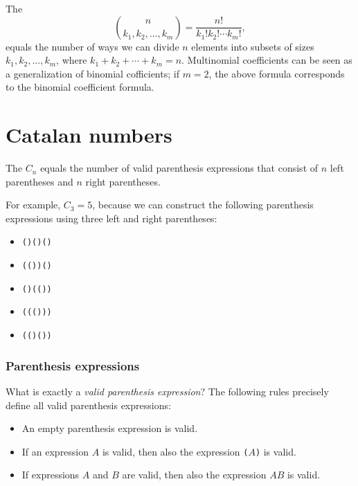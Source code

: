 
The 
\[ {n \choose k_1,k_2,\ldots,k_m} = \frac{n!}{k_1! k_2! \cdots k_m!}, \]
equals the number of ways
we can divide $n$ elements into subsets
of sizes $k_1,k_2,\ldots,k_m$,
where $k_1+k_2+\cdots+k_m=n$.
Multinomial coefficients can be seen as a
generalization of binomial cofficients;
if $m=2$, the above formula
corresponds to the binomial coefficient formula.

\section{Catalan numbers}


The 
$C_n$ equals the
number of valid
parenthesis expressions that consist of
$n$ left parentheses and $n$ right parentheses.

For example, $C_3=5$, because
we can construct the following parenthesis
expressions using three
left and right parentheses:

\begin{itemize}[noitemsep]
\item \texttt{()()()}
\item \texttt{(())()}
\item \texttt{()(())}
\item \texttt{((()))}
\item \texttt{(()())}
\end{itemize}

\subsubsection{Parenthesis expressions}


What is exactly a \emph{valid parenthesis expression}?
The following rules precisely define all
valid parenthesis expressions:

\begin{itemize}
\item An empty parenthesis expression is valid.
\item If an expression $A$ is valid,
then also the expression
\texttt{(}$A$\texttt{)} is valid.
\item If expressions $A$ and $B$ are valid,
then also the expression $AB$ is valid.
\end{itemize}

